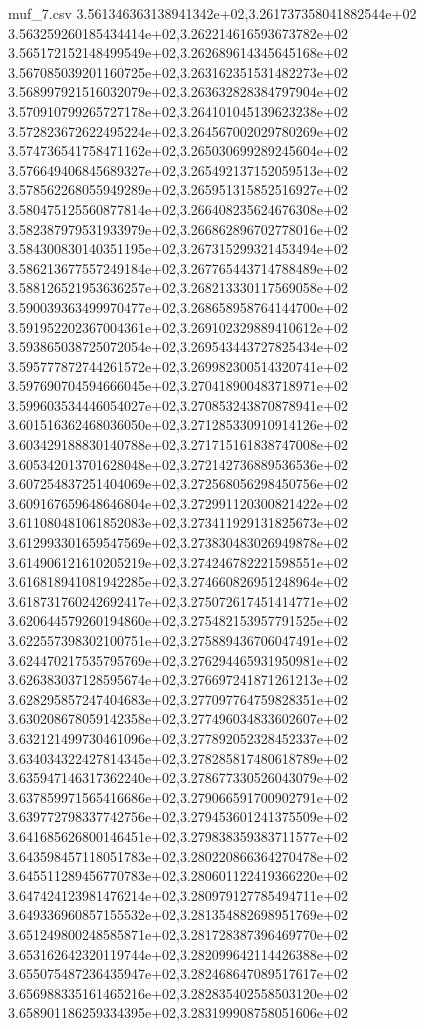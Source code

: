 \begin{filecontents*}{muf_7.csv}
3.561346363138941342e+02,3.261737358041882544e+02
3.563259260185434414e+02,3.262214616593673782e+02
3.565172152148499549e+02,3.262689614345645168e+02
3.567085039201160725e+02,3.263162351531482273e+02
3.568997921516032079e+02,3.263632828384797904e+02
3.570910799265727178e+02,3.264101045139623238e+02
3.572823672622495224e+02,3.264567002029780269e+02
3.574736541758471162e+02,3.265030699289245604e+02
3.576649406845689327e+02,3.265492137152059513e+02
3.578562268055949289e+02,3.265951315852516927e+02
3.580475125560877814e+02,3.266408235624676308e+02
3.582387979531933979e+02,3.266862896702778016e+02
3.584300830140351195e+02,3.267315299321453494e+02
3.586213677557249184e+02,3.267765443714788489e+02
3.588126521953636257e+02,3.268213330117569058e+02
3.590039363499970477e+02,3.268658958764144700e+02
3.591952202367004361e+02,3.269102329889410612e+02
3.593865038725072054e+02,3.269543443727825434e+02
3.595777872744261572e+02,3.269982300514320741e+02
3.597690704594666045e+02,3.270418900483718971e+02
3.599603534446054027e+02,3.270853243870878941e+02
3.601516362468036050e+02,3.271285330910914126e+02
3.603429188830140788e+02,3.271715161838747008e+02
3.605342013701628048e+02,3.272142736889536536e+02
3.607254837251404069e+02,3.272568056298450756e+02
3.609167659648646804e+02,3.272991120300821422e+02
3.611080481061852083e+02,3.273411929131825673e+02
3.612993301659547569e+02,3.273830483026949878e+02
3.614906121610205219e+02,3.274246782221598551e+02
3.616818941081942285e+02,3.274660826951248964e+02
3.618731760242692417e+02,3.275072617451414771e+02
3.620644579260194860e+02,3.275482153957791525e+02
3.622557398302100751e+02,3.275889436706047491e+02
3.624470217535795769e+02,3.276294465931950981e+02
3.626383037128595674e+02,3.276697241871261213e+02
3.628295857247404683e+02,3.277097764759828351e+02
3.630208678059142358e+02,3.277496034833602607e+02
3.632121499730461096e+02,3.277892052328452337e+02
3.634034322427814345e+02,3.278285817480618789e+02
3.635947146317362240e+02,3.278677330526043079e+02
3.637859971565416686e+02,3.279066591700902791e+02
3.639772798337742756e+02,3.279453601241375509e+02
3.641685626800146451e+02,3.279838359383711577e+02
3.643598457118051783e+02,3.280220866364270478e+02
3.645511289456770783e+02,3.280601122419366220e+02
3.647424123981476214e+02,3.280979127785494711e+02
3.649336960857155532e+02,3.281354882698951769e+02
3.651249800248585871e+02,3.281728387396469770e+02
3.653162642320119744e+02,3.282099642114426388e+02
3.655075487236435947e+02,3.282468647089517617e+02
3.656988335161465216e+02,3.282835402558503120e+02
3.658901186259334395e+02,3.283199908758051606e+02

\end{filecontents*}
